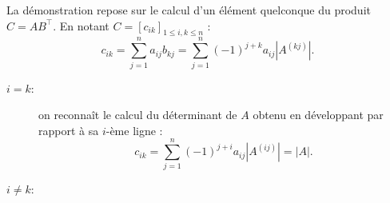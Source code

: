\proof
La démonstration repose sur le calcul d'un élément quelconque du produit $C = A B^\top$. En notant $C = [c_{ik}]_{1 \leq i, k \leq n}$ : 
$$
c_{ik} 
= \sum_{j=1}^n a_{ij} b_{kj} 
= \sum_{j=1}^n (-1)^{j+k} a_{ij} |A^{(kj)}|.
$$
\begin{description}
  \item[$i = k$:] on reconnaît le calcul du déterminant de $A$ obtenu en développant par rapport à sa $i$-ème ligne : 
  $$
  c_{ik} 
  = \sum_{j=1}^n (-1)^{j+i} a_{ij} |A^{(ij)}|
  = |A|.
  $$
  \item[$i \neq k$:] 

\end{description}
